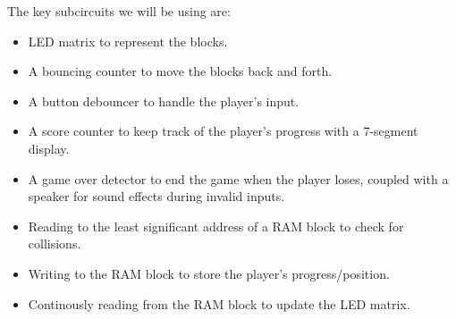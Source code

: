 \documentclass{article}
\begin{document}
    The key subcircuits we will be using are:
    \begin{itemize}
        \item LED matrix to represent the blocks.
        \item A bouncing counter to move the blocks back and forth.
        \item A button debouncer to handle the player's input.
        \item A score counter to keep track of the player's progress with a 7-segment display.
        \item A game over detector to end the game when the player loses, coupled with a speaker for sound effects during invalid inputs.
        \item Reading to the least significant address of a RAM block to check for collisions.
        \item Writing to the RAM block to store the player's progress/position.
        \item Continously reading from the RAM block to update the LED matrix.
    \end{itemize}
   
\end{document}
